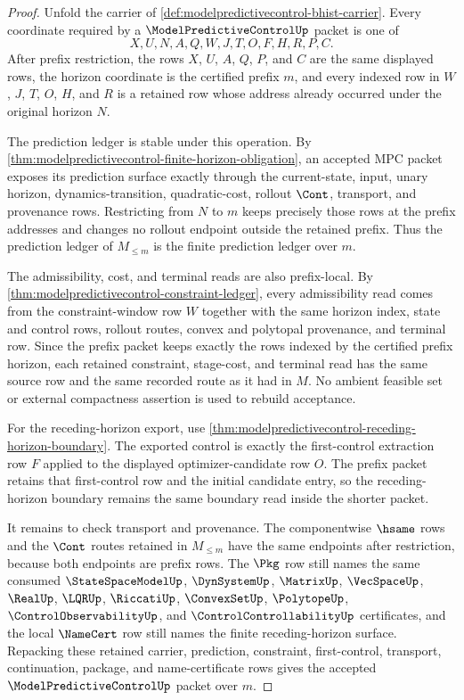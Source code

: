 \begin{proof}
Unfold the carrier of \autoref{def:modelpredictivecontrol-bhist-carrier}. Every
coordinate required by a $\ModelPredictiveControlUp$ packet is one of
$$
X,U,N,A,Q,W,J,T,O,F,H,R,P,C.
$$
After prefix restriction, the rows $X$, $U$, $A$, $Q$, $P$, and $C$ are the same
displayed rows, the horizon coordinate is the certified prefix $m$, and every
indexed row in $W$, $J$, $T$, $O$, $H$, and $R$ is a retained row whose address
already occurred under the original horizon $N$.

The prediction ledger is stable under this operation. By
\autoref{thm:modelpredictivecontrol-finite-horizon-obligation}, an accepted MPC
packet exposes its prediction surface exactly through the current-state, input,
unary horizon, dynamics-transition, quadratic-cost, rollout $\Cont$, transport,
and provenance rows. Restricting from $N$ to $m$ keeps precisely those rows at
the prefix addresses and changes no rollout endpoint outside the retained
prefix. Thus the prediction ledger of $M_{\leq m}$ is the finite prediction
ledger over $m$.

The admissibility, cost, and terminal reads are also prefix-local. By
\autoref{thm:modelpredictivecontrol-constraint-ledger}, every admissibility read
comes from the constraint-window row $W$ together with the same horizon index,
state and control rows, rollout routes, convex and polytopal provenance, and
terminal row. Since the prefix packet keeps exactly the rows indexed by the
certified prefix horizon, each retained constraint, stage-cost, and terminal
read has the same source row and the same recorded route as it had in $M$.
No ambient feasible set or external compactness assertion is used to rebuild
acceptance.

For the receding-horizon export, use
\autoref{thm:modelpredictivecontrol-receding-horizon-boundary}. The exported
control is exactly the first-control extraction row $F$ applied to the displayed
optimizer-candidate row $O$. The prefix packet retains that first-control row
and the initial candidate entry, so the receding-horizon boundary remains the
same boundary read inside the shorter packet.

It remains to check transport and provenance. The componentwise $\hsame$ rows
and the $\Cont$ routes retained in $M_{\leq m}$ have the same endpoints after
restriction, because both endpoints are prefix rows. The $\Pkg$ row still names
the same consumed $\StateSpaceModelUp$, $\DynSystemUp$, $\MatrixUp$,
$\VecSpaceUp$, $\RealUp$, $\LQRUp$, $\RiccatiUp$, $\ConvexSetUp$,
$\PolytopeUp$, $\ControlObservabilityUp$, and
$\ControlControllabilityUp$ certificates, and the local $\NameCert$ row still
names the finite receding-horizon surface. Repacking these retained carrier,
prediction, constraint, first-control, transport, continuation, package, and
name-certificate rows gives the accepted $\ModelPredictiveControlUp$ packet over
$m$.
\end{proof}

